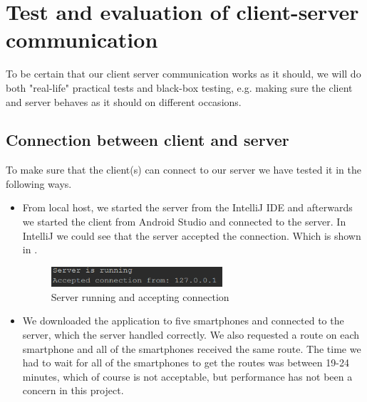 \section{Test and evaluation of client-server communication}
To be certain that our client server communication works as it should, we will do both "real-life" practical tests and black-box testing, e.g. making sure the client and server behaves as it should on different occasions.

\subsection{Connection between client and server}
To make sure that the client(s) can connect to our server we have tested it in the following ways.
\begin{itemize}
	\item From local host, we started the server from the IntelliJ IDE and afterwards we started the client from Android Studio and connected to the server. In IntelliJ we could see that the server accepted the connection. Which is shown in .
		\begin{figure}[h!]
  \centering
	    \includegraphics[width=0.6\textwidth]{figures/serverrunning.png}
    \caption{Server running and accepting connection}
    \label{fig:serverrunning}
\end{figure}
\end{itemize}
\begin{itemize}
	\item We downloaded the application to five smartphones and connected to the server, which the server handled correctly. We also requested a route on each smartphone and all of the smartphones received the same route. The time we had to wait for all of the smartphones to get the routes was between 19-24 minutes, which of course is not acceptable, but performance has not been a concern in this project.
\end{itemize}

